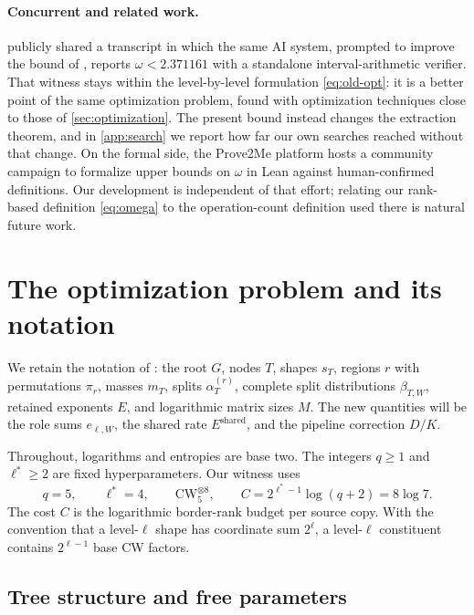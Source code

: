 \documentclass[11pt,a4paper]{article}
\newcommand{\CW}{\mathrm{CW}}
\newcommand{\Eshared}{E^{\mathrm{shared}}}
\begin{document}
\paragraph{Concurrent and related work.}
\citet{naslund2026} publicly shared a transcript in which the same AI system, prompted to improve the bound of \citet{dupont2026}, reports $\omega<2.371161$ with a standalone interval-arithmetic verifier. That witness stays within the level-by-level formulation \cref{eq:old-opt}: it is a better point of the same optimization problem, found with optimization techniques close to those of \cref{sec:optimization}. The present bound instead changes the extraction theorem, and in \cref{app:search} we report how far our own searches reached without that change. On the formal side, the Prove2Me platform \citep{prove2me2026} hosts a community campaign to formalize upper bounds on $\omega$ in Lean against human-confirmed definitions. Our development is independent of that effort; relating our rank-based definition \cref{eq:omega} to the operation-count definition used there is natural future work.

\section{The optimization problem and its notation}\label{sec:model}

We retain the notation of \citet[Section~2]{dupont2026}: the root $G$, nodes $T$, shapes $s_T$, regions $r$ with permutations $\pi_r$, masses $m_T$, splits $\alpha_T^{(r)}$, complete split distributions $\beta_{T,W}$, retained exponents $E$, and logarithmic matrix sizes $M$. The new quantities will be the role sums $e_{\ell,W}$, the shared rate $\Eshared$, and the pipeline correction $D/K$.

Throughout, logarithms and entropies are base two. The integers $q\ge1$ and $\ell^*\ge2$ are fixed hyperparameters. Our witness uses
\begin{equation}\label{eq:source}
q=5,\qquad \ell^*=4,\qquad \CW_5^{\otimes8},\qquad
C=2^{\ell^*-1}\log(q+2)=8\log7.
\end{equation}
The cost $C$ is the logarithmic border-rank budget per source copy. With the convention that a level-$\ell$ shape has coordinate sum $2^\ell$, a level-$\ell$ constituent contains $2^{\ell-1}$ base CW factors.

\subsection{Tree structure and free parameters}\label{sec:tree}
\end{document}
